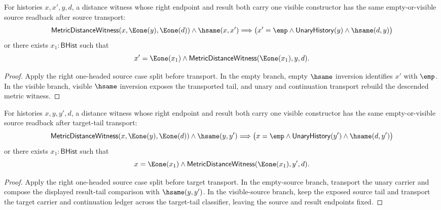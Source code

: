 \begin{theorem}
\label{thm:metric-distance-witness-right-e1-result-hsame-source}
For histories $x,x',y,d$, a distance witness whose right endpoint and result
both carry one visible constructor has the same empty-or-visible source
readback after source transport:
$$
\mathsf{MetricDistanceWitness}(x,\Eone(y),\Eone(d))\land\hsame(x,x')
\Longrightarrow
\bigl(x'=\emp\land\mathsf{UnaryHistory}(y)\land\hsame(d,y)\bigr)
$$
or there exists $x_1:\mathsf{BHist}$ such that
$$
x'=\Eone(x_1)\land\mathsf{MetricDistanceWitness}(\Eone(x_1),y,d).
$$
\end{theorem}
\begin{proof}
Apply the right one-headed source case split before transport. In the empty
branch, empty $\hsame$ inversion identifies $x'$ with $\emp$. In the visible
branch, visible $\hsame$ inversion exposes the transported tail, and unary and
continuation transport rebuild the descended metric witness.
\end{proof}

\begin{theorem}
\label{thm:metric-distance-witness-right-e1-result-hsame-target}
For histories $x,y,y',d$, a distance witness whose right endpoint and result
both carry one visible constructor has the same empty-or-visible source
readback after target-tail transport:
$$
\mathsf{MetricDistanceWitness}(x,\Eone(y),\Eone(d))\land\hsame(y,y')
\Longrightarrow
\bigl(x=\emp\land\mathsf{UnaryHistory}(y')\land\hsame(d,y')\bigr)
$$
or there exists $x_1:\mathsf{BHist}$ such that
$$
x=\Eone(x_1)\land\mathsf{MetricDistanceWitness}(\Eone(x_1),y',d).
$$
\end{theorem}
\begin{proof}
Apply the right one-headed source case split before target transport. In the
empty-source branch, transport the unary carrier and compose the displayed
result-tail comparison with $\hsame(y,y')$. In the visible-source branch, keep
the exposed source tail and transport the target carrier and continuation
ledger across the target-tail classifier, leaving the source and result
endpoints fixed.
\end{proof}


